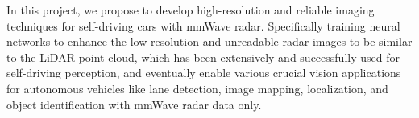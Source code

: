 In this project, we propose to develop high-resolution and reliable imaging techniques for self-driving cars with mmWave radar. Specifically training neural networks to enhance the low-resolution and unreadable radar images to be similar to the LiDAR point cloud, which has been extensively and successfully used for self-driving perception, and eventually enable various crucial vision applications for autonomous vehicles like lane detection, image mapping, localization, and object identification with mmWave radar data only.
 
